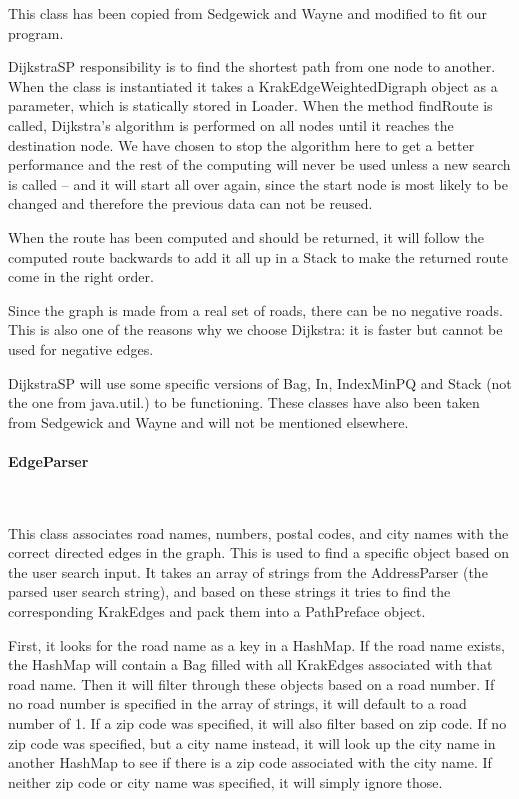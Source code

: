 \documentclass[a4paper,10pt,titlepage]{article}
\begin{document}
This class has been copied from Sedgewick and Wayne and modified to fit our program. 

DijkstraSP responsibility is to find the shortest path from one node to another. When the class is instantiated it takes a KrakEdgeWeightedDigraph object as a parameter, which is statically stored in Loader. When the method findRoute is called, Dijkstra’s algorithm is performed on all nodes until it reaches the destination node. We have chosen to stop the algorithm here to get a better performance and the rest of the computing will never be used unless a new search is called – and it will start all over again, since the start node is most likely to be changed and therefore the previous data can not be reused.

When the route has been computed and should be returned, it will follow the computed route backwards to add it all up in a Stack to make the returned route come in the right order.

Since the graph is made from a real set of roads, there can be no negative roads. This is also one of the reasons why we choose Dijkstra: it is faster but cannot be used for negative edges.

DijkstraSP will use some specific versions of Bag\cite{sedgewickAndWayneBag}, In\cite{sedgewickAndWayneIn}, IndexMinPQ\cite{sedgewickAndWayneIndexMinPQ} and Stack\cite{sedgewickAndWayneStack} (not the one from java.util.) to be functioning. These classes have also been taken from Sedgewick and Wayne and will not be mentioned elsewhere.
				
				\paragraph{EdgeParser}\mbox{}\
				
This class associates road names, numbers, postal codes, and city names with the correct directed edges in the graph. This is used to find a specific object based on the user search input. It takes an array of strings from the AddressParser (the parsed user search string), and based on these strings it tries to find the corresponding KrakEdges and pack them into a PathPreface object.

First, it looks for the road name as a key in a HashMap. If the road name exists, the HashMap will contain a Bag filled with all KrakEdges associated with that road name. Then it will filter through these objects based on a road number. If no road number is specified in the array of strings, it will default to a road number of 1. If a zip code was specified, it will also filter based on zip code. If no zip code was specified, but a city name instead, it will look up the city name in another HashMap to see if there is a zip code associated with the city name. If neither zip code or city name was specified, it will simply ignore those.
\end{document}
